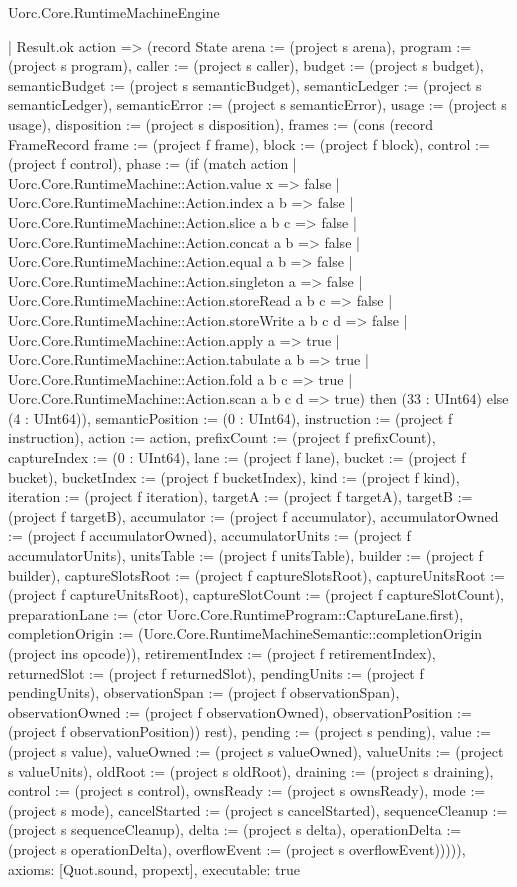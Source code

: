 \begin{lexlean}{Uorc.Core.RuntimeMachineEngine}
\begin{semanticmodule}
{        | Result.ok action => (record State {arena := (project s arena), program := (project s program), caller := (project s caller), budget := (project s budget), semanticBudget := (project s semanticBudget), semanticLedger := (project s semanticLedger), semanticError := (project s semanticError), usage := (project s usage), disposition := (project s disposition), frames := (cons (record FrameRecord {frame := (project f frame), block := (project f block), control := (project f control), phase := (if (match action
          | Uorc.Core.RuntimeMachine::Action.value x => false
          | Uorc.Core.RuntimeMachine::Action.index a b => false
          | Uorc.Core.RuntimeMachine::Action.slice a b c => false
          | Uorc.Core.RuntimeMachine::Action.concat a b => false
          | Uorc.Core.RuntimeMachine::Action.equal a b => false
          | Uorc.Core.RuntimeMachine::Action.singleton a => false
          | Uorc.Core.RuntimeMachine::Action.storeRead a b c => false
          | Uorc.Core.RuntimeMachine::Action.storeWrite a b c d => false
          | Uorc.Core.RuntimeMachine::Action.apply a => true
          | Uorc.Core.RuntimeMachine::Action.tabulate a b => true
          | Uorc.Core.RuntimeMachine::Action.fold a b c => true
          | Uorc.Core.RuntimeMachine::Action.scan a b c d => true) then (33 : UInt64) else (4 : UInt64)), semanticPosition := (0 : UInt64), instruction := (project f instruction), action := action, prefixCount := (project f prefixCount), captureIndex := (0 : UInt64), lane := (project f lane), bucket := (project f bucket), bucketIndex := (project f bucketIndex), kind := (project f kind), iteration := (project f iteration), targetA := (project f targetA), targetB := (project f targetB), accumulator := (project f accumulator), accumulatorOwned := (project f accumulatorOwned), accumulatorUnits := (project f accumulatorUnits), unitsTable := (project f unitsTable), builder := (project f builder), captureSlotsRoot := (project f captureSlotsRoot), captureUnitsRoot := (project f captureUnitsRoot), captureSlotCount := (project f captureSlotCount), preparationLane := (ctor Uorc.Core.RuntimeProgram::CaptureLane.first), completionOrigin := (Uorc.Core.RuntimeMachineSemantic::completionOrigin (project ins opcode)), retirementIndex := (project f retirementIndex), returnedSlot := (project f returnedSlot), pendingUnits := (project f pendingUnits), observationSpan := (project f observationSpan), observationOwned := (project f observationOwned), observationPosition := (project f observationPosition)}) rest), pending := (project s pending), value := (project s value), valueOwned := (project s valueOwned), valueUnits := (project s valueUnits), oldRoot := (project s oldRoot), draining := (project s draining), control := (project s control), ownsReady := (project s ownsReady), mode := (project s mode), cancelStarted := (project s cancelStarted), sequenceCleanup := (project s sequenceCleanup), delta := (project s delta), operationDelta := (project s operationDelta), overflowEvent := (project s overflowEvent)})))),
  axioms: [Quot.sound, propext],
  executable: true
}


\end{semanticmodule}
\end{lexlean}
